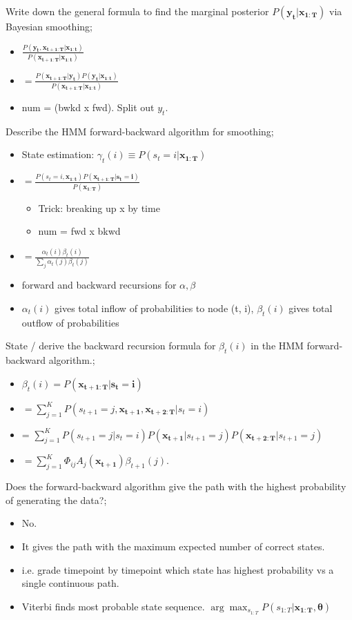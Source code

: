 \documentclass{article}
\begin{document}
Write down the general formula to find the marginal posterior $P(\mathbf{y_t|x_{1:T}})$ via Bayesian smoothing; \begin{itemize} \item $\frac{P(\mathbf{y_t, x_{t+1:T}|x_{1:t}})}{P(\mathbf{x_{t+1:T}|x_{1:t}})}$ \item $=\frac{P(\mathbf{x_{t+1:T}|y_t})P(\mathbf{y_t|x_{1:t}})}{P(\mathbf{x_{t+1:T}|x_{1:t}})}$ \item num = (bwkd x fwd). Split out $y_t$. \end{itemize}

Describe the HMM forward-backward algorithm for smoothing; \begin{itemize} \item State estimation: $\gamma_t(i)\equiv P(s_t=i|\mathbf{x_{1:T}})$ \item $=\frac{P(s_t=i, \mathbf{x_{1:t}})P(\mathbf{x_{t+1:T}|s_t=i})}{P(\mathbf{x_{1:T}})}$ \begin{itemize} \item Trick: breaking up x by time \item num = fwd x bkwd \end{itemize} \item $=\frac{\alpha_t(i)\beta_t(i)}{\sum_j\alpha_t(j)\beta_t(j)}$ \item forward and backward recursions for $\alpha, \beta$ \item $\alpha_t(i)$ gives total inflow of probabilities to node (t, i), $\beta_t(i)$ gives total outflow of probabilities \end{itemize}

State / derive the backward recursion formula for $\beta_t(i)$ in the HMM forward-backward algorithm.; \begin{itemize} \item $\beta_t(i)=P(\mathbf{x_{t+1:T}|s_t=i})$ \item $=\sum_{j=1}^K P(s_{t+1}=j, \mathbf{x_{t+1},  x_{t+2:T}}|s_t=i)$ \item = $\sum_{j=1}^K P(s_{t+1}=j | s_t=i) P(\mathbf{x_{t+1}}|s_{t+1}=j)P(\mathbf{x_{t+2:T}}|s_{t+1}=j)$ \item $=\sum_{j=1}^K\Phi_{ij}A_j(\mathbf{x_{t+1}})\beta_{t+1}(j)$. \end{itemize}

Does the forward-backward algorithm give the path with the highest probability of generating the data?; \begin{itemize} \item No.  \item It gives the path with the maximum expected number of correct states. \item i.e. grade timepoint by timepoint which state has highest probability vs a single continuous path. \item Viterbi finds most probable state sequence. $\arg\max_{s_{1:T}}P(s_{1:T}|\mathbf{x_{1:T},\theta})$ \end{itemize}
\end{document}
